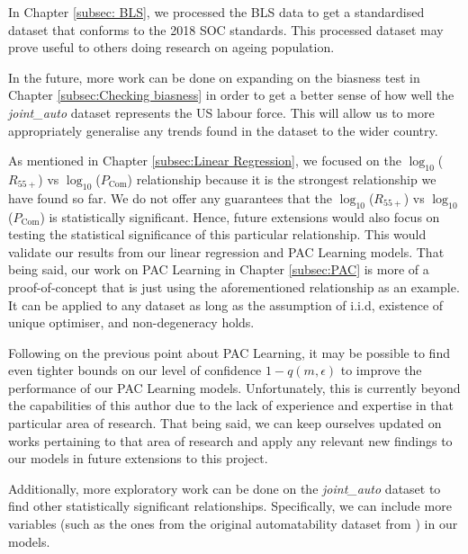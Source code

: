 \documentclass[11pt]{article}
\begin{document}
In Chapter \ref{subsec: BLS}, we processed the BLS data to get a standardised dataset that conforms to the 2018 SOC standards. This processed dataset may prove useful to others doing research on ageing population.

In the future, more work can be done on expanding on the biasness test in Chapter \ref{subsec:Checking biasness} in order to get a better sense of how well the \emph{joint\_auto} dataset represents the US labour force. This will allow us to more appropriately generalise any trends found in the dataset to the wider country.

As mentioned in Chapter \ref{subsec:Linear Regression}, we focused on the $\log_{10}$($R_{55+}$) vs $\log_{10}$($P_{\text{Com}}$) relationship because it is the strongest relationship we have found so far. We do not offer any guarantees that the $\log_{10}$($R_{55+}$) vs $\log_{10}$($P_{\text{Com}}$) is statistically significant. Hence, future extensions would also focus on testing the statistical significance of this particular relationship. This would validate our results from our linear regression and PAC Learning models. That being said, our work on PAC Learning in Chapter \ref{subsec:PAC} is more of a proof-of-concept that is just using the aforementioned relationship as an example. It can be applied to any dataset as long as the assumption of i.i.d, existence of unique optimiser, and non-degeneracy holds.

Following on the previous point about PAC Learning, it may be possible to find even tighter bounds on our level of confidence $1 - q(m,\epsilon)$ to improve the performance of our PAC Learning models. Unfortunately, this is currently beyond the capabilities of this author due to the lack of experience and expertise in that particular area of research. That being said, we can keep ourselves updated on works pertaining to that area of research and apply any relevant new findings to our models in future extensions to this project.

Additionally, more exploratory work can be done on the \emph{joint\_auto} dataset to find other statistically significant relationships. Specifically, we can include more variables (such as the ones from the original automatability dataset from \cite{osborne2017future}) in our models.

\clearpage

\printbibliography[heading=bibintoc]

\clearpage

\appendix
\end{document}
